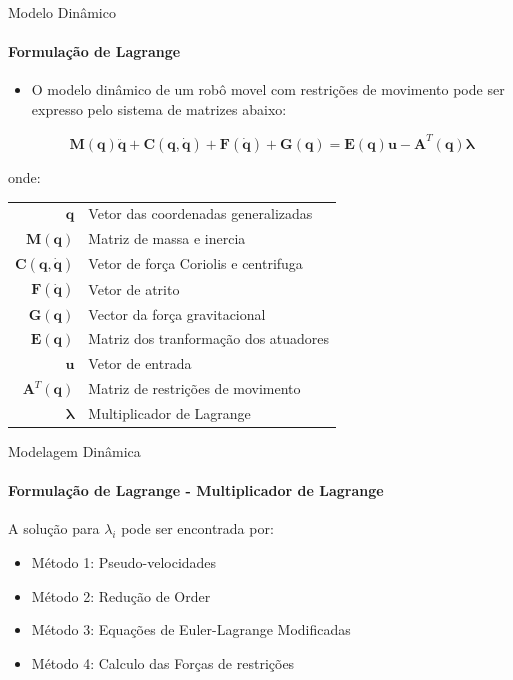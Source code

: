 \documentclass{beamer}
\newcommand{\cmark}{\textcolor{green}{\ding{51}}}%
\newcommand{\xmark}{\textcolor{red}{\ding{55}}}%
\begin{document}
\begin{frame}{Modelo Dinâmico}
    \framesubtitle{Formulação de Lagrange}
    \begin{itemize}
        \item O modelo dinâmico de um robô movel com restrições de movimento pode ser expresso pelo sistema de matrizes abaixo:

              \begin{equation}
                  \mathbf{M(q)\ddot{q}+ C(q, \dot{q})+ F(\dot{q})+G(q) = E(q)u -A}^T\mathbf{(q)}\boldsymbol{\lambda}
              \end{equation}
    \end{itemize}

    \begin{block}{}
        \scriptsize{
            onde:
            \begin{tabular}{ r | l }
                $\mathbf{q}$               & Vetor das coordenadas generalizadas   \\
                $\mathbf{M(q)}$            & Matriz de massa e inercia             \\
                $\mathbf{C(q, \dot{q})}$   & Vetor de força Coriolis e centrifuga  \\
                $\mathbf{F(\dot{q})}$      & Vetor de atrito                       \\
                $\mathbf{G(q)}$            & Vector da força gravitacional         \\
                $\mathbf{E(q)}$            & Matriz dos tranformação dos atuadores \\
                $\mathbf{u}$               & Vetor de entrada                      \\
                $\mathbf{A}^T\mathbf{(q)}$ & Matriz de restrições de movimento     \\
                $\boldsymbol{\lambda}$     & Multiplicador de Lagrange             \\
            \end{tabular}}
    \end{block}
\end{frame}



\begin{frame}{Modelagem Dinâmica}
    \framesubtitle{Formulação de Lagrange - Multiplicador de Lagrange}
    A solução para $\lambda_i$ pode ser encontrada por:
    \begin{itemize}
        \item Método 1: Pseudo-velocidades \cmark
        \item Método 2: Redução de Order \xmark
        \item Método 3: Equações de Euler-Lagrange Modificadas \xmark
        \item Método 4: Calculo das Forças de restrições \xmark
    \end{itemize}
\end{frame}
\end{document}
